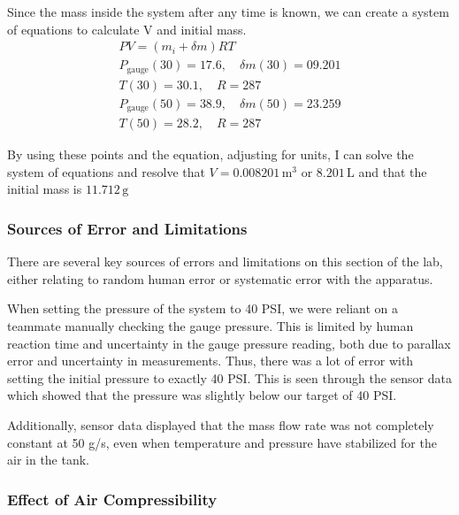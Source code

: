 \documentclass[12pt,letterpaper]{article}
\begin{document}
Since the mass inside the system after any time is known, we can create a system of equations to calculate V and initial mass. \@
\begingroup
\allowdisplaybreaks[4]
\begin{gather*}
    PV = (m_i + \delta m)RT \\
    P_{\mathrm{gauge}}(30) = 17.6,\quad \delta m(30) = 09.201 \\
    T(30) = 30.1,\quad R = 287 \\
    P_{\mathrm{gauge}}(50) = 38.9,\quad \delta m(50) = 23.259 \\
    T(50) = 28.2,\quad R = 287
\end{gather*}
\endgroup

By using these points and the equation, adjusting for units, I can solve the system of equations and resolve that $V = 0.008201\,\mathrm{m}^3$ or $8.201\,\mathrm{L}$ and that the initial mass is $11.712\,\mathrm{g}$

\subsubsection{Sources of Error and Limitations}


There are several key sources of errors and limitations on this section of the lab, either relating to random human error or systematic error with the apparatus. \@ 

When setting the pressure of the system to 40 PSI, we were reliant on a teammate manually checking the gauge pressure. \@ This is limited by human reaction time and uncertainty in the gauge pressure reading, both due to parallax error and uncertainty in measurements. \@ Thus, there was a lot of error with setting the initial pressure to exactly 40 PSI. \@ This is seen through the sensor data which showed that the pressure was slightly below our target of 40 PSI. \@

Additionally, sensor data displayed that the mass flow rate was not completely constant at 50 g/s, even when temperature and pressure have stabilized for the air in the tank. \@

\subsubsection{Effect of Air Compressibility}
\end{document}
